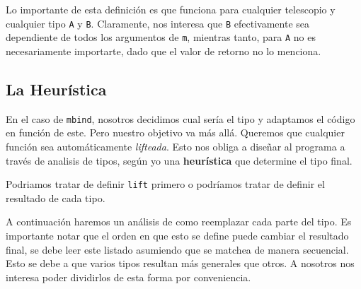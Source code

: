 Lo importante de esta definición es que funciona para cualquier telescopio y
cualquier tipo \lstinline{A} y \lstinline{B}. Claramente, nos interesa que \lstinline{B}
efectivamente sea dependiente de todos los argumentos de \lstinline{m}, mientras
tanto, para \lstinline{A} no es necesariamente importarte, dado que el valor de
retorno no lo menciona.

\subsection{La Heurística}

En el caso de \lstinline{mbind}, nosotros decidimos cual sería el tipo y adaptamos el
código en función de este. Pero nuestro objetivo va más allá. Queremos que
cualquier función sea automáticamente \textit{lifteada}. Esto nos obliga a
diseñar al programa a través de analisis de tipos, según yo una
\textbf{heurística} que determine el tipo final.

Podriamos tratar de definir \lstinline{lift} primero o podríamos tratar de definir el
resultado de cada tipo.

A continuación haremos un análisis de como reemplazar cada parte del tipo. Es
importante notar que el orden en que esto se define puede cambiar el resultado
final, se debe leer este listado asumiendo que se matchea de manera secuencial.
Esto se debe a que varios tipos resultan más generales que otros. A nosotros nos
interesa poder dividirlos de esta forma por conveniencia.

